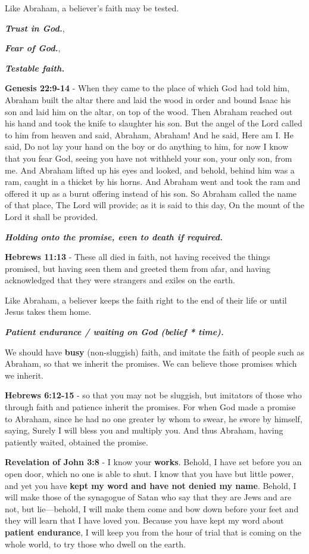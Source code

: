 \documentclass[11pt]{article}
\begin{document}
Like Abraham, a believer's faith may be tested.

\emph{\textbf{Trust in God.}},

\emph{\textbf{Fear of God.}},

\emph{\textbf{Testable faith.}}

\textbf{Genesis 22:9-14} - When they came to the place of which God had told him, Abraham built the altar there and laid the wood in order and bound Isaac his son and laid him on the altar, on top of the wood.  Then Abraham reached out his hand and took the knife to slaughter his son.  But the angel of the Lord called to him from heaven and said, Abraham, Abraham! And he said, Here am I.  He said, Do not lay your hand on the boy or do anything to him, for now I know that you fear God, seeing you have not withheld your son, your only son, from me.  And Abraham lifted up his eyes and looked, and behold, behind him was a ram, caught in a thicket by his horns. And Abraham went and took the ram and offered it up as a burnt offering instead of his son.  So Abraham called the name of that place, The Lord will provide; as it is said to this day, On the mount of the Lord it shall be provided.

\emph{\textbf{Holding onto the promise, even to death if required.}}

\textbf{Hebrews 11:13} - These all died in faith, not having received the things promised, but having seen them and greeted them from afar, and having acknowledged that they were strangers and exiles on the earth.

Like Abraham, a believer keeps the faith right to the end of their life or until Jesus takes them home.

\emph{\textbf{Patient endurance / waiting on God (belief * time).}}

We should have \textbf{busy} (non-sluggish) faith,
and imitate the faith of people such as
Abraham, so that we inherit the promises.
We can believe those promises which we inherit.

\textbf{Hebrews 6:12-15} - so that you may not be sluggish, but imitators of those who through faith and patience inherit the promises.  For when God made a promise to Abraham, since he had no one greater by whom to swear, he swore by himself, saying, Surely I will bless you and multiply you.  And thus Abraham, having patiently waited, obtained the promise.

\textbf{Revelation of John 3:8} - I know your \textbf{works}. Behold, I have set before you an open door, which no one is able to shut. I know that you have but little power, and yet you have \textbf{kept my word and have not denied my name}.  Behold, I will make those of the synagogue of Satan who say that they are Jews and are not, but lie—behold, I will make them come and bow down before your feet and they will learn that I have loved you.  Because you have kept my word about \textbf{patient endurance}, I will keep you from the hour of trial that is coming on the whole world, to try those who dwell on the earth.
\end{document}
